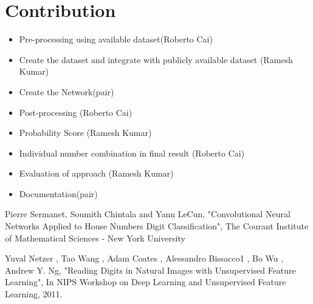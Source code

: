 \documentclass[12pt, letterpaper]{article}
\begin{document}
\section{Contribution}

\begin{itemize}
	\item Pre-processing using available dataset(Roberto Cai)
	\item Create the dataset and integrate with publicly available dataset (Ramesh Kumar)
	\item Create the Network(pair)
	\item Post-processing (Roberto Cai)
	\item Probability Score (Ramesh Kumar)
	\item Individual number combination in final result (Roberto Cai)
	\item Evaluation of approach (Ramesh Kumar)
	\item Documentation(pair)
\end{itemize}

\begin{thebibliography}{9}
Pierre Sermanet, Soumith Chintala and Yann LeCun, "Convolutional Neural Networks Applied to
House Numbers Digit Classification", The Courant Institute of Mathematical Sciences - New York University 


Yuval Netzer
, Tao Wang
, Adam Coates
, Alessandro Bissacco1
, Bo Wu
, Andrew Y. Ng, "Reading Digits in Natural Images
with Unsupervised Feature Learning", In NIPS Workshop on Deep
Learning and Unsupervised Feature Learning, 2011.
\end{thebibliography} 
\end{document}
